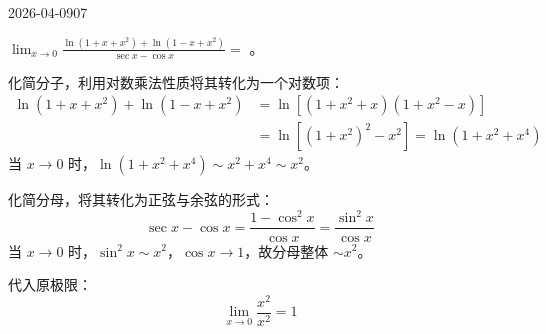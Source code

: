 \begin{mistake}{2026-04-09}{07}

\begin{problemcontent}
\( \lim_{x \to 0} \frac{\ln(1+x+x^2) + \ln(1-x+x^2)}{\sec x - \cos x} = \) \underline{\hspace{2em}}。
\end{problemcontent}

\begin{solutioncontent}
化简分子，利用对数乘法性质将其转化为一个对数项：
\[
\begin{aligned}
\ln(1+x+x^2) + \ln(1-x+x^2) &= \ln[(1+x^2+x)(1+x^2-x)] \\
&= \ln[(1+x^2)^2 - x^2] = \ln(1+x^2+x^4)
\end{aligned}
\]
当 \(x \to 0\) 时，\(\ln(1+x^2+x^4) \sim x^2+x^4 \sim x^2\)。

化简分母，将其转化为正弦与余弦的形式：
\[
\sec x - \cos x = \frac{1 - \cos^2 x}{\cos x} = \frac{\sin^2 x}{\cos x}
\]
当 \(x \to 0\) 时，\(\sin^2 x \sim x^2\)，\(\cos x \to 1\)，故分母整体 \(\sim x^2\)。

代入原极限：
\[
\lim_{x \to 0} \frac{x^2}{x^2} = 1
\]
\end{solutioncontent}


\end{mistake}
